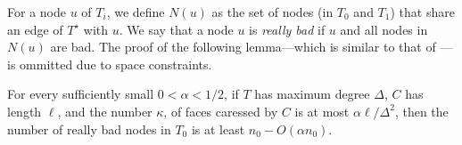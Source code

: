 \documentclass[a4paper,UKenglish]{socg-lipics-v2019}
\newcommand{\dual}[1]{{#1}^\star}
\begin{document}
For a node $u$ of $T_i$, we define $N(u)$ as the set of nodes (in $T_0$
and $T_1$) that share an edge of $\dual{T}$ with $u$.  We say that a
node $u$ is \emph{really bad} if $u$ and all nodes in $N(u)$ are bad.
The proof of the following lemma---which is similar to that of ---is ommitted due to space constraints.

\begin{lem}
  For every sufficiently small $0<\alpha < 1/2$,  
  if $T$ has maximum degree $\Delta$, $C$ has length $\ell$, and the number
  $\kappa$, of faces caressed by $C$ is at most $\alpha\ell/\Delta^2$, then
  the number of really bad nodes in $T_0$ is at least $n_0-O(\alpha n_0)$.
\end{lem}

%  
%
\end{document}

